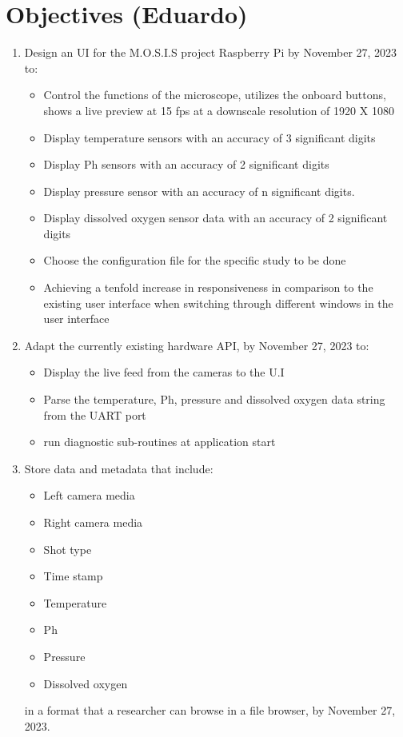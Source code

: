 \section{Objectives (Eduardo)}
\begin{enumerate}
    \item Design an UI for the M.O.S.I.S project Raspberry Pi by November 27, 2023 to:
    \begin{itemize}
        \item Control the functions of the microscope, utilizes the onboard buttons, shows a live preview at 15 fps at a downscale resolution of 1920 X 1080
        \item Display temperature sensors with an accuracy of 3 significant digits
        \item Display Ph sensors with an accuracy of 2 significant digits
        \item Display pressure sensor with an accuracy of n significant digits.
        \item Display dissolved oxygen sensor data with an accuracy of 2 significant digits
        \item Choose the configuration file for the specific study to be done
        \item Achieving a tenfold increase in responsiveness in comparison to the existing user interface when switching through different windows in the user interface
    \end{itemize} 
    \item Adapt the currently existing hardware API, by November 27, 2023 to:
    \begin{itemize}
        \item Display the live feed from the cameras to the U.I 
        \item Parse the temperature, Ph, pressure and dissolved oxygen data string from the UART port
        \item run diagnostic sub-routines at application start
    \end{itemize}
    \item Store data and metadata that include:
    \begin{itemize}
        \item Left camera media
        \item Right camera media
        \item Shot type
        \item Time stamp
        \item Temperature
        \item Ph
        \item Pressure
        \item Dissolved oxygen
    \end{itemize}
    in a format that a researcher can browse in a file browser, by November 27, 2023.
\end{enumerate}